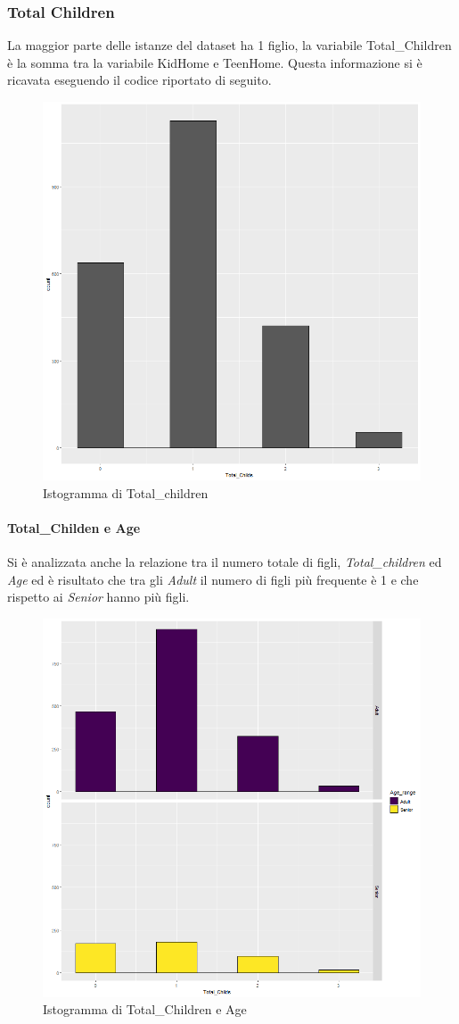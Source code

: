 \documentclass[letterpaper,11pt]{article}
\begin{document}
\newpage
\subsubsection{Total Children}
La maggior parte delle istanze del dataset ha 1 figlio, la variabile Total\_Children è la somma tra la variabile KidHome e TeenHome. Questa informazione si è ricavata eseguendo il codice riportato di seguito.

\begin{figure}[h]
    \centering
    \includegraphics[width=.4\textwidth]{Img/EDA/EDA009.png}
    \caption{Istogramma di Total\_children }
    \label{fig:IstogrammaTc}
\end{figure}

\paragraph{Total\_Childen e Age}
Si è analizzata anche la relazione tra il numero totale di figli, \textit{Total\_children} ed \textit{Age} ed è risultato che tra gli \textit{Adult} il numero di figli più frequente è 1 e che rispetto ai \textit{Senior} hanno più figli.


\begin{figure}[H]
    \centering
    \includegraphics[width=.45\textwidth]{Img/EDA/EDA010.png}
    \caption{Istogramma di Total\_Children e Age}
    \label{fig:IstogrammaTcAge}
\end{figure}
\newpage
\end{document}
